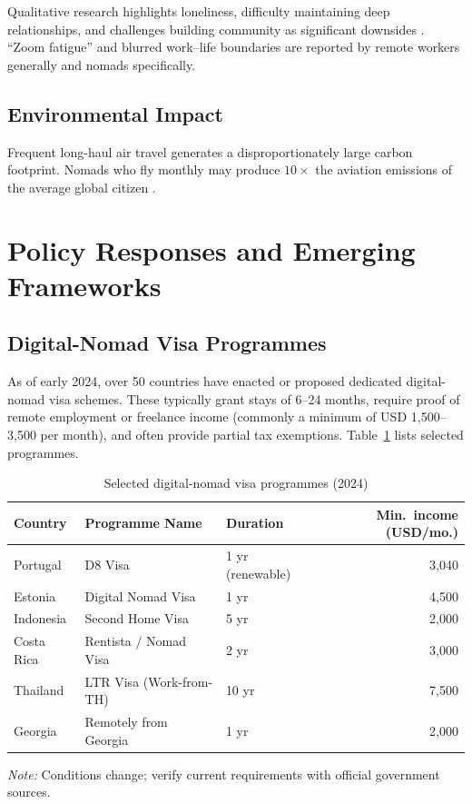 \documentclass[12pt,a4paper]{article}
\begin{document}
Qualitative research highlights loneliness, difficulty maintaining deep
relationships, and challenges building community as significant downsides
\citep{Mancinelli2020}. ``Zoom fatigue'' and blurred work--life boundaries are
reported by remote workers generally and nomads specifically.

\subsection{Environmental Impact}

Frequent long-haul air travel generates a disproportionately large carbon
footprint. Nomads who fly monthly may produce $10\times$ the aviation emissions
of the average global citizen \citep{Cames2015}.

\section{Policy Responses and Emerging Frameworks}
\label{sec:policy}

\subsection{Digital-Nomad Visa Programmes}

As of early 2024, over 50 countries have enacted or proposed dedicated
digital-nomad visa schemes. These typically grant stays of 6–24 months,
require proof of remote employment or freelance income (commonly a minimum of
USD 1,500–3,500 per month), and often provide partial tax exemptions.
Table~\ref{tab:visas} lists selected programmes.

\begin{table}[H]
  \centering
  \caption{Selected digital-nomad visa programmes (2024)}
  \label{tab:visas}
  \begin{tabular}{lllr}
    \toprule
    \textbf{Country} & \textbf{Programme Name} & \textbf{Duration}
      & \textbf{Min.\ income (USD/mo.)} \\
    \midrule
    Portugal   & D8 Visa                 & 1 yr (renewable) & 3,040 \\
    Estonia    & Digital Nomad Visa      & 1 yr             & 4,500 \\
    Indonesia  & Second Home Visa        & 5 yr             & 2,000 \\
    Costa Rica & Rentista / Nomad Visa   & 2 yr             & 3,000 \\
    Thailand   & LTR Visa (Work-from-TH) & 10 yr            & 7,500 \\
    Georgia    & Remotely from Georgia   & 1 yr             & 2,000 \\
    \bottomrule
  \end{tabular}
  \small\textit{Note:} Conditions change; verify current requirements with official government sources.
\end{table}
\end{document}
